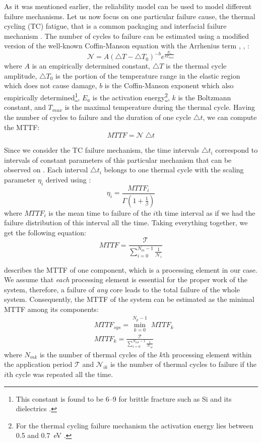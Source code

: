 As it was mentioned earlier, the reliability model can be used to model different failure mechanisms. Let us now focus on one particular failure cause, the thermal cycling (TC) fatigue, that is a common packaging and interfacial failure mechanism \cite{jedec2010}. The number of cycles to failure can be estimated using a modified version of the well-known Coffin-Manson equation with the Arrhenius term \cite{jedec2010}, \cite{xiang2010}, \cite{ciappa2003}:
\begin{equation} \label{eq:cycles-to-failure}
  \mathcal{N} = A (\triangle T - \triangle T_0)^{-b} e^{\frac{E_a}{k T_{max}}}
\end{equation}
where $A$ is an empirically determined constant, $\triangle T$ is the thermal cycle amplitude, $\triangle T_0$ is the portion of the temperature range in the elastic region which does not cause damage, $b$ is the Coffin-Manson exponent which also empirically determined\footnote{This constant is found to be 6--9 for brittle fracture such as Si and its dielectrics \cite{jedec2010}.}, $E_{a}$ is the activation energy\footnote{For the thermal cycling failure mechanism the activation energy lies between 0.5 and 0.7~eV \cite{vigrass}.}, $k$ is the Boltzmann constant, and $T_{max}$ is the maximal temperature during the thermal cycle. Having the number of cycles to failure and the duration of one cycle $\triangle t$, we can compute the MTTF:
\[
  MTTF = \mathcal{N} \; \triangle t
\]

Since we consider the TC failure mechanism, the time intervals $\triangle t_i$ correspond to intervals of constant parameters of this particular mechanism that can be observed on . Each interval $\triangle t_i$ belongs to one thermal cycle with the scaling parameter $\eta_i$ derived using :
\[
  \eta_i = \frac{MTTF_i}{\Gamma(1 + \frac{1}{\beta})}
\]
where $MTTF_i$ is the mean time to failure of the $i$th time interval as if we had the failure distribution of this interval all the time. Taking everything together, we get the following equation:
\begin{equation} \label{eq:one-mttf}
  MTTF = \frac{\mathcal{T}}{\sum_{i=0}^{N_m - 1} \frac{1}{\mathcal{N}_i}}
\end{equation}

 describes the MTTF of one component, which is a processing element in our case. We assume that \emph{each} processing element is essential for the proper work of the system, therefore, a failure of \emph{any} core leads to the total failure of the whole system. Consequently, the MTTF of the system can be estimated as the minimal MTTF among its components:
\begin{align*}
  & MTTF_{sys} = \min_{k=0}^{N_p - 1} \; MTTF_k \\
  & MTTF_k = \frac{\mathcal{T}}{\sum_{i=0}^{N_{mk} - 1} \frac{1}{\mathcal{N}_{ik}}}
\end{align*}
where $N_{mk}$ is the number of thermal cycles of the $k$th processing element within the application period $\mathcal{T}$ and $\mathcal{N}_{ik}$ is the number of thermal cycles to failure if the $i$th cycle was repeated all the time.

